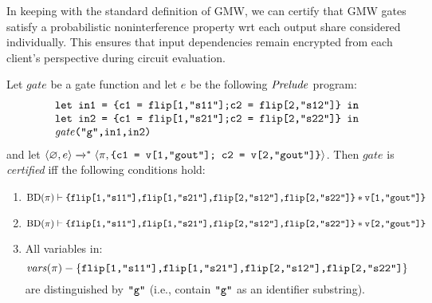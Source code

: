 In keeping with the standard definition of GMW, we can certify that
GMW gates satisfy a probabilistic noninterference property wrt each
output share considered individually. This ensures that input
dependencies remain encrypted from each client's perspective during
circuit evaluation.
\begin{definition}
  \label{definition-gmwgate-certification}
  Let $\mathit{gate}$ be a gate function and let $e$ be the following
  $\mathit{Prelude}$ program:
  $$
  \begin{array}{l}
    \texttt{let in1 = \{c1 = flip[1,"s11"];c2 = flip[2,"s12"]\} in}\\
    \texttt{let in2 = \{c1 = flip[1,"s21"];c2 = flip[2,"s22"]\} in}\\
    \mathit{gate}\texttt{("g",in1,in2)}
  \end{array}
  $$
  and let $
  \langle \varnothing,e \rangle\xrightarrow{}^{*}\langle \pi,\texttt{\{c1 = v[1,"gout"]; c2 = v[2,"gout"]\}} \rangle
  $.
  Then $\mathit{gate}$ is \emph{certified} iff the following conditions hold:
  \begin{enumerate}[\hspace{5mm}i.]
  \item {\small$\mathrm{BD}(\pi) \vdash \texttt{\{flip[1,"s11"],flip[1,"s21"],flip[2,"s12"],flip[2,"s22"]\}} * \texttt{v[1,"gout"]\}}$}
  \item {\small$\mathrm{BD}(\pi) \vdash \texttt{\{flip[1,"s11"],flip[1,"s21"],flip[2,"s12"],flip[2,"s22"]\}} * \texttt{v[2,"gout"]\}}$}
  \item All variables in:$$\mathit{vars}(\pi) - \{ \texttt{flip[1,"s11"],flip[1,"s21"],flip[2,"s12"],flip[2,"s22"]}\}$$
    are distinguished by $\texttt{"g"}$ (i.e., contain $\texttt{"g"}$ as an identifier substring). 
  \end{enumerate}
\end{definition}

